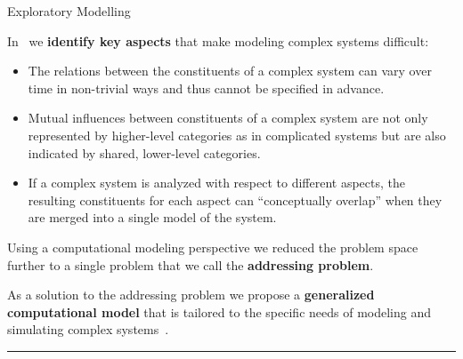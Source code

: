 \begin{frame}{Exploratory Modelling }

\justifying
In~\cite{Kerdels2012} we {\bf identify key aspects} that make modeling complex 
systems difficult:

\begin{itemize}
	\item The relations between the constituents of a complex system can vary
    over time in non-trivial ways and thus cannot be specified in advance.
    \item Mutual influences between constituents of a complex system are not 
    only represented by higher-level categories as in complicated systems but 
    are also indicated by shared, lower-level categories.
    \item If a complex system is analyzed with respect to different aspects, the
    resulting constituents for each aspect can ``conceptually overlap'' when 
    they are merged into a single model of the system.
\end{itemize}

\vspace{1em}
Using a computational modeling perspective we reduced the problem space further
to a single problem that we call the {\bf addressing problem}.

\vspace{1em}
As a solution to the addressing problem we propose a {\bf generalized 
computational model} that is tailored to the specific needs of modeling and 
simulating complex systems~\cite{Kerdels2012,Kerdels2013a}.


\begin{center}
\rule{2cm}{0.4pt}\\[0.5em]
\end{center}


\end{frame}


